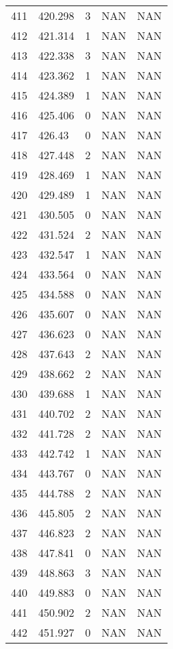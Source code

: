 \documentclass{article}
\begin{document}
\begin{longtable}{@{}lllll@{}}
				411 & 420.298 & 3    & NAN  & NAN  \\
				412 & 421.314 & 1    & NAN  & NAN  \\
				413 & 422.338 & 3    & NAN  & NAN  \\
				414 & 423.362 & 1    & NAN  & NAN  \\
				415 & 424.389 & 1    & NAN  & NAN  \\
				416 & 425.406 & 0    & NAN  & NAN  \\
				417 & 426.43  & 0    & NAN  & NAN  \\
				418 & 427.448 & 2    & NAN  & NAN  \\
				419 & 428.469 & 1    & NAN  & NAN  \\
				420 & 429.489 & 1    & NAN  & NAN  \\
				421 & 430.505 & 0    & NAN  & NAN  \\
				422 & 431.524 & 2    & NAN  & NAN  \\
				423 & 432.547 & 1    & NAN  & NAN  \\
				424 & 433.564 & 0    & NAN  & NAN  \\
				425 & 434.588 & 0    & NAN  & NAN  \\
				426 & 435.607 & 0    & NAN  & NAN  \\
				427 & 436.623 & 0    & NAN  & NAN  \\
				428 & 437.643 & 2    & NAN  & NAN  \\
				429 & 438.662 & 2    & NAN  & NAN  \\
				430 & 439.688 & 1    & NAN  & NAN  \\
				431 & 440.702 & 2    & NAN  & NAN  \\
				432 & 441.728 & 2    & NAN  & NAN  \\
				433 & 442.742 & 1    & NAN  & NAN  \\
				434 & 443.767 & 0    & NAN  & NAN  \\
				435 & 444.788 & 2    & NAN  & NAN  \\
				436 & 445.805 & 2    & NAN  & NAN  \\
				437 & 446.823 & 2    & NAN  & NAN  \\
				438 & 447.841 & 0    & NAN  & NAN  \\
				439 & 448.863 & 3    & NAN  & NAN  \\
				440 & 449.883 & 0    & NAN  & NAN  \\
				441 & 450.902 & 2    & NAN  & NAN  \\
				442 & 451.927 & 0    & NAN  & NAN  \\

\end{longtable}
\end{document}
